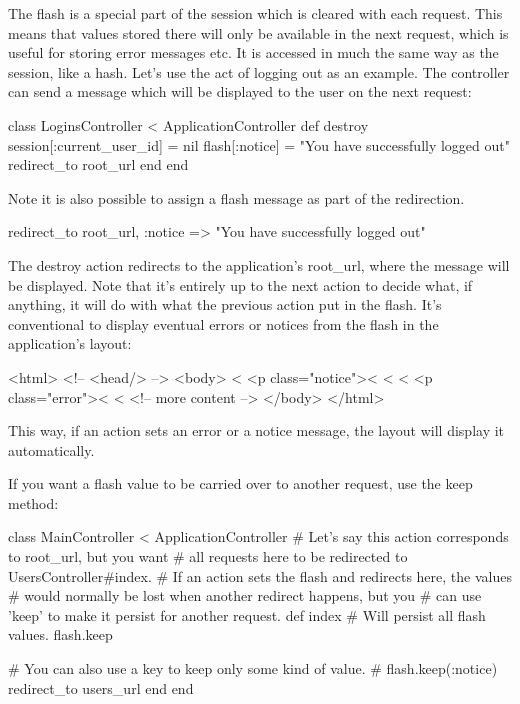\documentclass[10pt]{book}
\newenvironment{code}{%
  \scriptsize
    \verbatim
}{%
    \endverbatim
    \newline
}
\begin{document}
The flash is a special part of the session which is cleared with each  request. This means that values stored there will only be available in  the next request, which is useful for storing error messages etc. It is  accessed in much the same way as the session, like a hash. Let’s use the  act of logging out as an example. The controller can send a message  which will be displayed to the user on the next request:
\begin{code}
class LoginsController < ApplicationController
  def destroy
    session[:current_user_id] = nil
    flash[:notice] = "You have successfully logged out"
    redirect_to root_url
  end
end
\end{code}

Note it is also possible to assign a flash message as part of the redirection.
\begin{code}
redirect_to root_url, :notice => "You have successfully logged out"
\end{code}

The destroy action redirects to the application’s root\_url,  where the message will be displayed. Note that it’s entirely up to the  next action to decide what, if anything, it will do with what the  previous action put in the flash. It’s conventional to display eventual  errors or notices from the flash in the application’s layout:
\begin{code}
<html>
  <!-- <head/> -->
  <body>
    <%
      <p class="notice"><%
    <%
    <%
      <p class="error"><%
    <%
    <!-- more content -->
  </body>
</html>
\end{code}

This way, if an action sets an error or a notice message, the layout will display it automatically.

If you want a flash value to be carried over to another request, use the keep method:
\begin{code}
class MainController < ApplicationController
  # Let's say this action corresponds to root_url, but you want
  # all requests here to be redirected to UsersController#index.
  # If an action sets the flash and redirects here, the values
  # would normally be lost when another redirect happens, but you
  # can use 'keep' to make it persist for another request.
  def index
    # Will persist all flash values.
    flash.keep
 
    # You can also use a key to keep only some kind of value.
    # flash.keep(:notice)
    redirect_to users_url
  end
end
\end{code}
\end{document}
